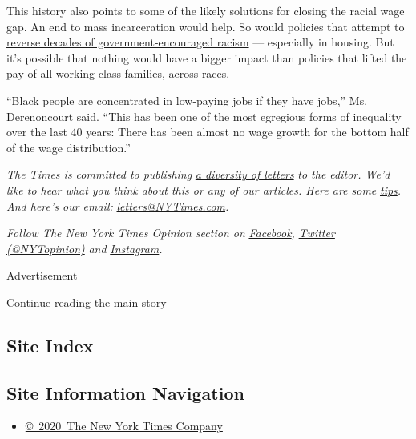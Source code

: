 This history also points to some of the likely solutions for closing the
racial wage gap. An end to mass incarceration would help. So would
policies that attempt to
\href{https://www.nytimes3xbfgragh.onion/interactive/2020/06/24/magazine/reparations-slavery.html}{reverse
decades of government-encouraged racism} --- especially in housing. But
it's possible that nothing would have a bigger impact than policies that
lifted the pay of all working-class families, across races.

``Black people are concentrated in low-paying jobs if they have jobs,''
Ms. Derenoncourt said. ``This has been one of the most egregious forms
of inequality over the last 40 years: There has been almost no wage
growth for the bottom half of the wage distribution.''

\emph{The Times is committed to publishing}
\href{https://www.nytimes3xbfgragh.onion/2019/01/31/opinion/letters/letters-to-editor-new-york-times-women.html}{\emph{a
diversity of letters}} \emph{to the editor. We'd like to hear what you
think about this or any of our articles. Here are some}
\href{https://help.nytimes3xbfgragh.onion/hc/en-us/articles/115014925288-How-to-submit-a-letter-to-the-editor}{\emph{tips}}\emph{.
And here's our email:}
\href{mailto:letters@NYTimes.com}{\emph{letters@NYTimes.com}}\emph{.}

\emph{Follow The New York Times Opinion section on}
\href{https://www.facebookcorewwwi.onion/nytopinion}{\emph{Facebook}}\emph{,}
\href{http://twitter.com/NYTOpinion}{\emph{Twitter (@NYTopinion)}}
\emph{and}
\href{https://www.instagram.com/nytopinion/}{\emph{Instagram}}\emph{.}

Advertisement

\protect\hyperlink{after-bottom}{Continue reading the main story}

\hypertarget{site-index}{%
\subsection{Site Index}\label{site-index}}

\hypertarget{site-information-navigation}{%
\subsection{Site Information
Navigation}\label{site-information-navigation}}

\begin{itemize}
\tightlist
\item
  \href{https://help.nytimes3xbfgragh.onion/hc/en-us/articles/115014792127-Copyright-notice}{©~2020~The
  New York Times Company}
\end{itemize}

